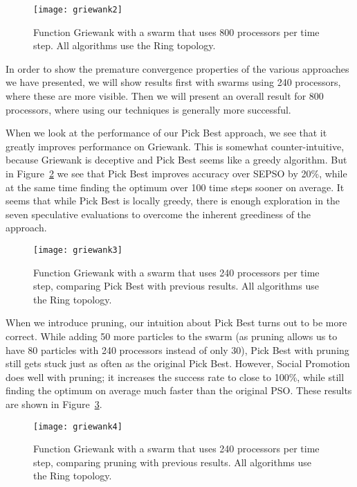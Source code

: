 \documentclass[smallcondensed]{svjour3}
\newcommand{\fig}[1]{Figure~\ref{fig:#1}}
\begin{document}
\begin{figure}
  \centering
  \texttt{[image: griewank2]}
  \caption{Function Griewank with a swarm that uses 800 processors per time
  step.  All algorithms use the Ring topology.}
  \label{fig:basic-griewank2}
\end{figure}

In order to show the premature convergence properties of the various approaches
we have presented, we will show results first with swarms using 240 processors,
where these are more visible.  Then we will present an overall result for 800
processors, where using our techniques is generally more successful.

When we look at the performance of our Pick Best approach, we see that it
greatly improves performance on Griewank.  This is somewhat counter-intuitive,
because Griewank is deceptive and Pick Best seems like a greedy algorithm.  But
in \fig{griewank-pickbest} we see that Pick Best improves accuracy over SEPSO
by 20\%, while at the same time finding the optimum over 100 time steps sooner
on average.  It seems that while Pick Best is locally greedy, there is enough
exploration in the seven speculative evaluations to overcome the inherent
greediness of the approach.

\begin{figure}
  \centering
  \texttt{[image: griewank3]}
  \caption{Function Griewank with a swarm that uses 240 processors per time
  step, comparing Pick Best with previous results.  All algorithms use the Ring
  topology.}
  \label{fig:griewank-pickbest}
\end{figure}

When we introduce pruning, our intuition about Pick Best turns out to be more
correct.  While adding 50 more particles to the swarm (as pruning allows us to
have 80 particles with 240 processors instead of only 30), Pick Best with
pruning still gets stuck just as often as the original Pick Best.  However,
Social Promotion does well with pruning; it increases the success rate to close
to 100\%, while still finding the optimum on average much faster than the
original PSO.  These results are shown in \fig{griewank-pruned}.

\begin{figure}
  \centering
  \texttt{[image: griewank4]}
  \caption{Function Griewank with a swarm that uses 240 processors per time
  step, comparing pruning with previous results.  All algorithms use the Ring
  topology.}
  \label{fig:griewank-pruned}
\end{figure}
\end{document}
